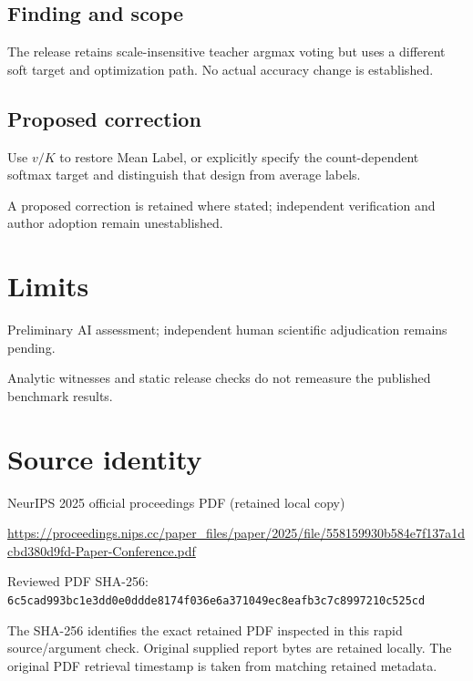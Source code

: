 \documentclass[11pt]{article}
\begin{document}
\subsection*{Finding and scope}

The release retains scale-insensitive teacher argmax voting but uses a different soft target and optimization path. No actual accuracy change is established.

\subsection*{Proposed correction}

Use \(v/K\) to restore Mean Label, or explicitly specify the count-dependent softmax target and distinguish that design from average labels.

A proposed correction is retained where stated; independent verification and author adoption remain unestablished.

\section*{Limits}

Preliminary AI assessment; independent human scientific adjudication remains pending.\par

Analytic witnesses and static release checks do not remeasure the published benchmark results.\par

\section*{Source identity}

NeurIPS 2025 official proceedings PDF (retained local copy)

\url{https://proceedings.nips.cc/paper_files/paper/2025/file/558159930b584e7f137a1dcbd380d9fd-Paper-Conference.pdf}

Reviewed PDF SHA-256: \nolinkurl{6c5cad993bc1e3dd0e0ddde8174f036e6a371049ec8eafb3c7c8997210c525cd}

The SHA-256 identifies the exact retained PDF inspected in this rapid source/argument check. Original supplied report bytes are retained locally. The original PDF retrieval timestamp is taken from matching retained metadata.
\end{document}
